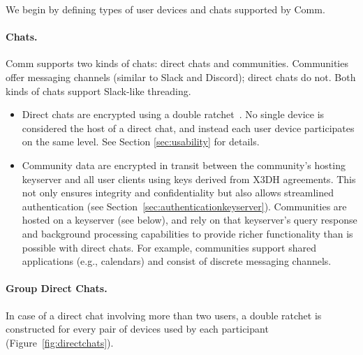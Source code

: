 \documentclass{article}
\begin{document}
We begin by defining types of user devices and chats supported by Comm.

\paragraph{Chats.} Comm supports two kinds of chats: direct chats and communities. Communities offer messaging channels (similar to Slack and Discord); direct chats do not. Both kinds of chats support Slack-like threading.


\begin{itemize}
    \item Direct chats are encrypted using a double ratchet~\cite{drsecurity}. No single device is considered the host of a direct chat, and instead each user device participates on the same level. See Section \ref{sec:usability} for details.
    \item Community data are encrypted in transit between the community's hosting keyserver and all user clients using keys derived from X3DH agreements. This not only ensures integrity and confidentiality but also allows streamlined authentication (see Section~\ref{sec:authenticationkeyserver}). Communities are hosted on a keyserver (see below), and rely on that keyserver's query response and background processing capabilities to provide richer functionality than is possible with direct chats. For example, communities support shared applications (e.g., calendars) and consist of discrete messaging channels.
\end{itemize}

\paragraph{Group Direct Chats.} In case of a direct chat involving more than two users, a double ratchet is constructed for every pair of devices used by each participant (Figure~\ref{fig:directchats}).
\end{document}

